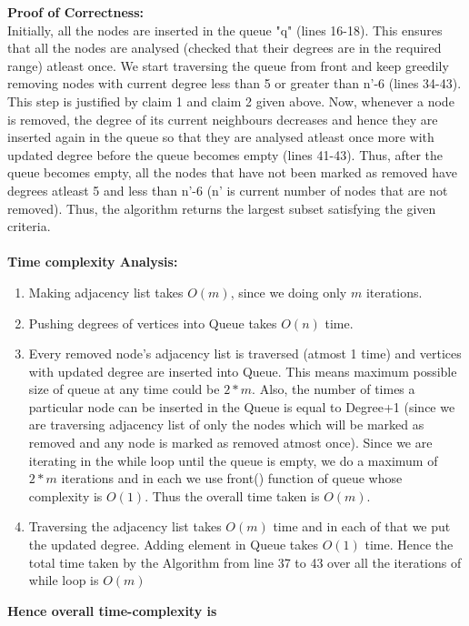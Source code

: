 \documentclass{article}
\begin{document}
\textbf{Proof of Correctness:}
\\
Initially, all the nodes are inserted in the queue "q" (lines 16-18). This ensures that all the nodes are analysed (checked that their degrees are in the required range) atleast once. We start traversing the queue from front and keep greedily removing nodes with current degree less than 5 or greater than n'-6 (lines 34-43). This step is justified by claim 1 and claim 2 given above. Now, whenever a node is removed, the degree of its current neighbours decreases and hence they are inserted again in the queue so that they are analysed atleast once more with updated degree before the queue becomes empty (lines 41-43). Thus, after the queue becomes empty, all the nodes that have not been marked as removed have degrees atleast 5 and less than n'-6 (n' is current number of nodes that are not removed). Thus, the algorithm returns the largest subset satisfying the given criteria.
\\\\
\textbf{Time complexity Analysis:}
\begin{enumerate}
    \item Making adjacency list takes $O(m)$, since we doing only $m$ iterations.
    \item Pushing degrees of vertices into Queue takes $O(n)$ time.
    \item Every removed node's adjacency list is traversed (atmost 1 time) and vertices with updated degree are inserted into Queue. This means maximum possible size of queue at any time could be $2*m$. Also, the number of times a particular node can be inserted in the Queue is equal to Degree+1 (since we are traversing adjacency list of only the nodes which will be marked as removed and any node is marked as removed atmost once). Since we are iterating in the while loop until the queue is empty, we do a maximum of $2*m$ iterations and in each we use front() function of queue whose complexity is $O(1)$. Thus the overall time taken is $O(m)$.
    \item Traversing the adjacency list takes $O(m)$ time and in each of that we put the updated degree. Adding element in Queue takes $O(1)$ time. Hence the total time taken by the Algorithm from line 37 to 43 over all the iterations of while loop is $O(m)$
\end{enumerate}
\textbf{Hence overall time-complexity is }
\newpage
\subsection{}
\end{document}
